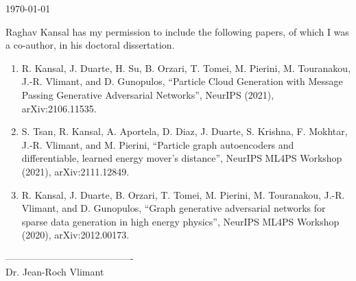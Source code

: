 \documentclass{article}
\begin{document}
\today

Raghav Kansal has my permission to include the following papers, of which
I was a co-author, in his doctoral dissertation.

\begin{enumerate}
    \item R. Kansal, J. Duarte, H. Su, B. Orzari, T. Tomei, M. Pierini, M. Touranakou, J.-R. Vlimant, and D. Gunopulos, “Particle Cloud Generation with Message Passing Generative Adversarial Networks”, NeurIPS (2021), arXiv:2106.11535.
    \item S. Tsan, R. Kansal, A. Aportela, D. Diaz, J. Duarte, S. Krishna, F. Mokhtar, J.-R. Vlimant, and M. Pierini, “Particle graph autoencoders and differentiable, learned energy mover's distance”, NeurIPS ML4PS Workshop (2021), arXiv:2111.12849.
    \item R. Kansal, J. Duarte, B. Orzari, T. Tomei, M. Pierini, M. Touranakou, J.-R. Vlimant, and D. Gunopulos, “Graph generative adversarial networks for sparse data generation in high energy physics”, NeurIPS ML4PS Workshop (2020), arXiv:2012.00173.
\end{enumerate}

\baselineskip
----------------------------------------\\
Dr. Jean-Roch Vlimant
\end{document}
